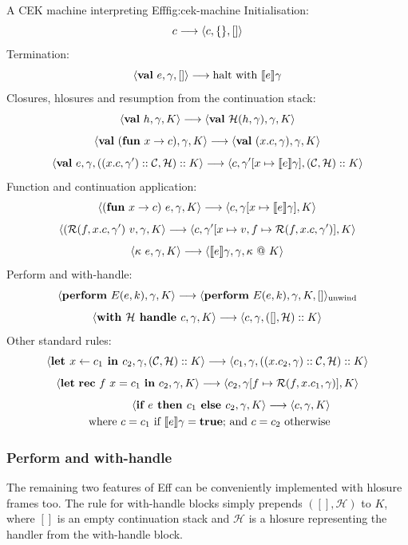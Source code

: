 \documentclass[class=article, crop=false]{standalone}
\begin{document}
\begin{myfigure}[0.9]{A CEK machine interpreting Eff}{fig:cek-machine}
    Initialisation:
    $$ c \longrightarrow \langle c, \{\}, [] \rangle $$
    Termination:
    $$ \langle  \mathbf{val}\  e, \gamma, []  \rangle \longrightarrow \text{halt with } \llbracket e \rrbracket\gamma$$
    Closures, hlosures and resumption from the continuation stack:
    $$ \langle  \mathbf{val}\  h, \gamma, K \rangle \longrightarrow \langle \mathbf{val}\  \mathcal{H}(h, \gamma), \gamma, K \rangle $$
    $$ \langle  \mathbf{val}\  (\mathbf{fun}\  x \to c), \gamma, K \rangle \longrightarrow \langle \mathbf{val}\  (x.c, \gamma), \gamma, K  \rangle $$
    $$ \langle  \mathbf{val}\  e, \gamma, ((x.c, \gamma') :: \mathcal{C}, \mathcal{H}) :: K  \rangle \longrightarrow
        \langle c, \gamma'[x \mapsto \llbracket e \rrbracket\gamma], (\mathcal{C}, \mathcal{H}) :: K \rangle $$
    Function and continuation application:
    $$ \langle  (\mathbf{fun}\  x \to c)\ e, \gamma, K \rangle \longrightarrow \langle c, \gamma[x \mapsto \llbracket e \rrbracket\gamma], K  \rangle $$
    $$ \langle  (\mathcal{R}(f, x.c, \gamma')\ v, \gamma, K \rangle \longrightarrow \langle c, \gamma'[x \mapsto v, f \mapsto \mathcal{R}(f, x.c, \gamma')], K  \rangle $$
    $$ \langle \kappa\ e, \gamma, K  \rangle \longrightarrow \langle  \llbracket e \rrbracket \gamma, \gamma, \kappa\ @\ K  \rangle $$
    Perform and with-handle:
    $$ \langle  \mathbf{perform}\  E(e,k), \gamma, K  \rangle \longrightarrow \langle  \mathbf{perform}\  E(e,k), \gamma, K, []  \rangle_{\text{unwind}} $$
    $$ \langle  \textbf{with } \mathcal{H} \textbf{ handle } c, \gamma, K  \rangle \longrightarrow \langle  c, \gamma, ([], \mathcal{H}) :: K  \rangle $$
    Other standard rules:
    $$ \langle  \textbf{let } x \leftarrow c_1 \textbf{ in } c_2, \gamma, (\mathcal{C}, \mathcal{H}) :: K \rangle \longrightarrow 
    \langle  c_1, \gamma, ((x. c_2, \gamma) :: \mathcal{C}, \mathcal{H}) :: K  \rangle $$
    $$ \langle \mathbf{let}\  \mathbf{rec}\  f\ x = c_1 \ \mathbf{in}\  c_2, \gamma, K \rangle \longrightarrow
    \langle c_2, \gamma[f \mapsto \mathcal{R}(f, x.c_1, \gamma)], K \rangle $$
    \begin{align*}
    \langle  \textbf{if } e \textbf{ then } c_1 \textbf{ else } c_2, \gamma, K  \rangle \longrightarrow \langle  c, \gamma, K  \rangle \\
    \text{ where $c = c_1$ if $\llbracket e \rrbracket \gamma = \textbf{true}$; and $c = c_2$ otherwise}
    \end{align*}
\end{myfigure}

\subsubsection{Perform and with-handle}

The remaining two features of Eff can be conveniently implemented with hlosure
frames too. The rule for with-handle blocks simply prepends $([], \mathcal{H})$
to $K$, where $[]$ is an empty continuation stack and $\mathcal{H}$ is a
hlosure representing the handler from the with-handle block.
\end{document}
